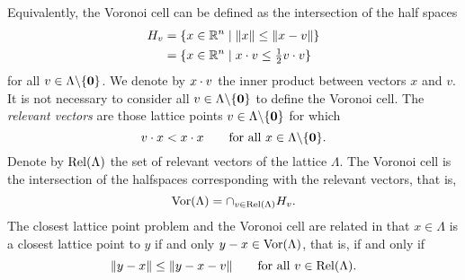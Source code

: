 \documentclass[final,leqno]{siamltex}
\begin{document}
Equivalently, the Voronoi cell can be defined as the intersection of the half spaces 
\begin{align*}
H_{v} &= \{x \in {\mathbb R}^n \mid \|x\| \leq \|x - v\| \} \\
&= \{x \in {\mathbb R}^n \mid x \cdot v \leq \tfrac{1}{2}v \cdot v \}
\end{align*}
for all $v \in \Lambda \backslash  \{\boldsymbol{0}\}$.  %
We denote by $x \cdot v$ the inner product between vectors $x$ and $v$.
It is not necessary to consider all $v \in \Lambda \backslash  \{\boldsymbol{0}\}$ to define the Voronoi cell.   %
The \emph{relevant vectors} are those lattice points $v \in \Lambda \backslash  \{\boldsymbol{0}\}$ for which  
\[
v \cdot x < x \cdot x \qquad \text{for all $x \in \Lambda \backslash  \{\boldsymbol{0}\}$}.
\]
Denote by $\operatorname{Rel}(\Lambda)$ the set of relevant vectors of the lattice $\Lambda$.  The Voronoi cell is the intersection of the halfspaces corresponding with the relevant vectors, that is, 
\[
\operatorname{Vor}(\Lambda) = \cap_{v\in\operatorname{Rel}(\Lambda)}{H_{v}}.
\]
The closest lattice point problem and the Voronoi cell are related in that $x\in\Lambda$ is a closest lattice point to $y$ if and only $y - x \in \operatorname{Vor}(\Lambda)$, that is, if and only if
\begin{equation}\label{eq:relvectnearpointieq}
\|y - x\| \leq  \|y - x - v\|  \qquad \text{for all $v \in \relevant(\Lambda)$}.
\end{equation} 

\end{document}
